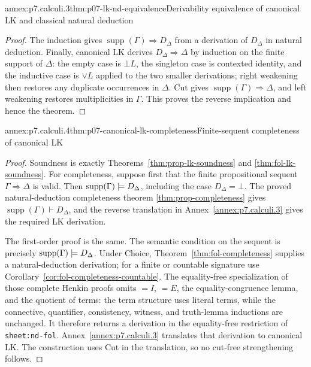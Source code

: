 \begin{annexitem}{annex:p7.calculi.3}{thm:p07-lk-nd-equivalence}{Derivability equivalence of canonical LK and classical natural deduction}
\begin{proof}
The induction gives
\(\operatorname{supp}(\Gamma)\Rightarrow D_{\Delta}\) from a derivation of
\(D_{\Delta}\) in natural deduction.  Finally, canonical LK derives
\(D_{\Delta}\Rightarrow\Delta\) by induction on the finite support of
\(\Delta\): the empty case is \(\bot L\), the singleton case is contexted
identity, and the inductive case is \(\lor L\) applied to the two smaller
derivations; right weakening then restores any duplicate occurrences in
\(\Delta\).  Cut gives
\(\operatorname{supp}(\Gamma)\Rightarrow\Delta\), and left weakening restores
multiplicities in \(\Gamma\).  This proves the reverse implication and hence
the theorem.
\end{proof}
\end{annexitem}

\begin{annexitem}{annex:p7.calculi.4}{thm:p07-canonical-lk-completeness}{Finite-sequent completeness of canonical LK}
\begin{proof}
Soundness is exactly Theorems~\ref{thm:prop-lk-soundness} and
\ref{thm:fol-lk-soundness}.  For completeness, suppose first that the finite
propositional sequent \(\Gamma\Rightarrow\Delta\) is valid.  Then
\(\operatorname{supp}(\Gamma)\models D_{\Delta}\), including the case
\(D_{\Delta}=\bot\).  The proved natural-deduction completeness theorem
\ref{thm:prop-completeness} gives
\(\operatorname{supp}(\Gamma)\vdash D_{\Delta}\), and the reverse translation
in Annex~\ref{annex:p7.calculi.3} gives the required LK derivation.

The first-order proof is the same.  The semantic condition on the sequent is
precisely
\(\operatorname{supp}(\Gamma)\models D_{\Delta}\).  Under Choice,
Theorem~\ref{thm:fol-completeness} supplies a natural-deduction derivation; for
a finite or countable signature use
Corollary~\ref{cor:fol-completeness-countable}.  The equality-free
specialization of those complete Henkin proofs omits \(=I\), \(=E\), the
equality-congruence lemma, and the quotient of terms: the term structure uses
literal terms, while the connective, quantifier, consistency, witness, and
truth-lemma inductions are unchanged.  It therefore returns a derivation in
the equality-free restriction of \texttt{sheet:nd-fol}.  Annex~\ref{annex:p7.calculi.3}
translates that derivation to canonical LK.  The construction uses Cut in the
translation, so no cut-free strengthening follows.
\end{proof}
\end{annexitem}
